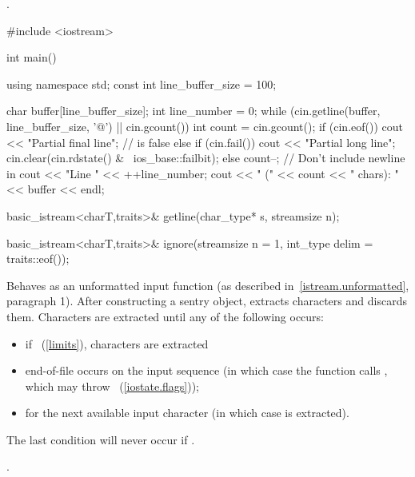 \begin{itemdescr}
\pnum
\returns
{}.

\pnum
\enterexample
\begin{codeblock}
#include <iostream>

int main() {
  using namespace std;
  const int line_buffer_size = 100;

  char buffer[line_buffer_size];
  int line_number = 0;
  while (cin.getline(buffer, line_buffer_size, '@\textbackslash@n') || cin.gcount()) {
    int count = cin.gcount();
    if (cin.eof())
      cout << "Partial final line";   //  is false
    else if (cin.fail()) {
      cout << "Partial long line";
      cin.clear(cin.rdstate() & ~ios_base::failbit);
    } else {
      count--;                        // Don't include newline in 
      cout << "Line " << ++line_number;
    }
    cout << " (" << count << " chars): " << buffer << endl;
  }
}
\end{codeblock}
\exitexample
\end{itemdescr}

%
\begin{itemdecl}
basic_istream<charT,traits>& getline(char_type* s, streamsize n);
\end{itemdecl}

\begin{itemdescr}
\pnum
\returns
{}
\end{itemdescr}

%
\begin{itemdecl}
basic_istream<charT,traits>&
    ignore(streamsize n = 1, int_type delim = traits::eof());
\end{itemdecl}

\begin{itemdescr}
\pnum
\effects
Behaves as an unformatted input function
(as described in~\ref{istream.unformatted}, paragraph 1).
After constructing a sentry object, extracts
characters and discards them.
Characters are extracted until any of the following occurs:
\begin{itemize}
\item
if
~(\ref{limits}),
 characters are extracted
\item
end-of-file occurs on the input sequence
(in which case the function calls
,
which may throw
~(\ref{iostate.flags}));
\item
{}
for the next available input character 
(in which case  is extracted).
\end{itemize}

\pnum
\notes
The last condition will never occur if
.

\pnum
\returns
{}.
\end{itemdescr}

